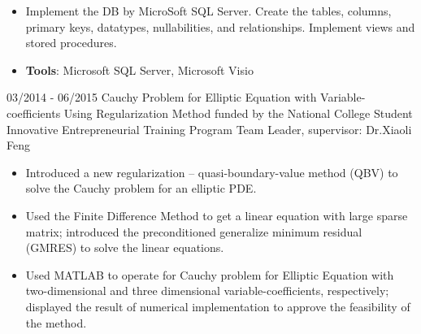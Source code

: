 \documentclass[letterpaper]{twentysecondcv} %
\begin{document}
\begin{twenty}
{{\begin{itemize}
				\item Implement the DB by MicroSoft SQL Server. Create the tables, columns, primary keys, datatypes, nullabilities, and relationships. Implement views and stored procedures.
				\item \textbf{Tools}: Microsoft SQL Server, Microsoft Visio\vspace{2mm}
		\end{itemize}}		
	}
	\twentyitem
	{03/2014}
	{- 06/2015}
	{Cauchy Problem for Elliptic Equation with Variable-coefficients Using Regularization Method}
	{funded by the National College Student Innovative Entrepreneurial Training Program}
	{Team Leader, supervisor: Dr.Xiaoli Feng}
	{
		{\begin{itemize}
				\item Introduced a new regularization -- quasi-boundary-value method (QBV) to solve the Cauchy problem for an elliptic PDE.
				\item Used the Finite Difference Method to get a linear equation with large sparse matrix; introduced the preconditioned generalize minimum residual (GMRES) to solve the linear equations.
				\item Used MATLAB to operate for Cauchy problem for Elliptic Equation with two-dimensional and three dimensional variable-coefficients, respectively; displayed the result of numerical implementation to approve the feasibility of the method. \vspace{2mm}
		\end{itemize}}
	}

\end{twenty}
\newpage
{}
\end{document}
